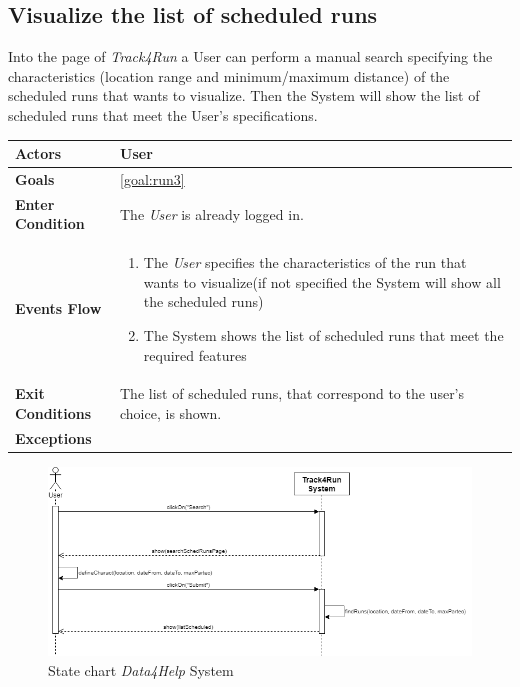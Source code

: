  \subsection{Visualize the list of scheduled runs}
Into the page of \emph{Track4Run} a User can perform a manual search specifying the characteristics (location range and minimum/maximum distance) of the scheduled runs that wants to visualize. Then the System will show the list of scheduled runs that meet the User's specifications. 

\begin{table}[H]
	\centering
    
    \begin{tabular}{|p{3.5cm}|p{10.3cm}|}
    
    \hline
    \textbf{\large{Actors}}  			& \tabitem User 	\\
    				 					
    \hline
    \textbf{\large{Goals}} 				& \ref{goal:run3}\\
    
    \hline
    \textbf{\large{Enter Condition}}	& The \emph{User} is already logged in.		\\
    
    \hline
    \textbf{\large{Events Flow}}		& \begin{enumerate}[leftmargin=0.5cm]
                                          	\item The \emph{User} specifies the characteristics of the run that wants to visualize(if not specified the System will show all the scheduled runs)  
                                          	 \item The System shows the list of scheduled runs that meet the required features
                                          \end{enumerate}
    										\\
    \hline
    \textbf{\large{Exit Conditions}}    & The list of scheduled runs, that correspond to the user's choice, is shown.  \\
    
    \hline
    \textbf{\large{Exceptions}} 		& \\
    
    \hline
    
    
    \end{tabular}
	
\end{table}

\begin{figure}[H]
    \centering
    \includegraphics[scale=0.4]{Pictures/visListSchedRunsSeqDiag.png}
    \caption{State chart  \emph{Data4Help} System}
\end{figure}
